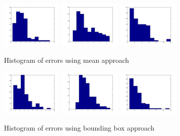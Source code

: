 \documentclass[10pt,a4paper,oneclumn]{article}
\begin{document}
\begin{figure}[h!]
\centering
  \includegraphics[width=3cm]{redHist.jpg}
  \includegraphics[width=3cm]{greenHist.jpg}
  \includegraphics[width=3cm]{yellowHist.jpg}
\caption{Histogram of errors using mean approach}
\end{figure}

\begin{figure}[h!]
\centering
  \includegraphics[width=3cm]{redHistBound.jpg}
  \includegraphics[width=3cm]{greenHistBound.jpg}
  \includegraphics[width=3cm]{yellowHistBound.jpg}
\caption{Histogram of errors using bounding box approach}
\end{figure}
\end{document}
